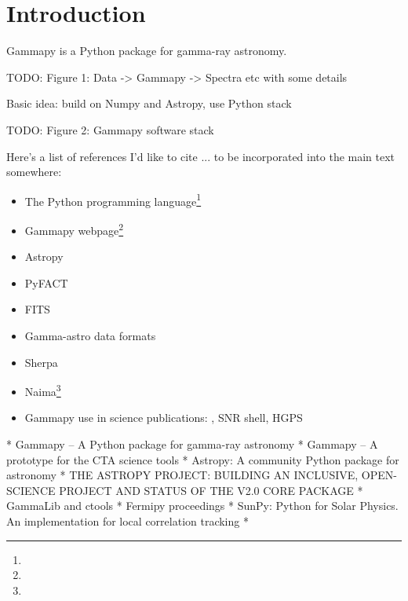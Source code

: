 \section{Introduction}
\label{sec:intro}

Gammapy is a Python package for gamma-ray astronomy.



TODO: Figure 1: Data -> Gammapy -> Spectra etc with some details 

Basic idea: build on Numpy and Astropy, use Python stack

TODO: Figure 2: Gammapy software stack

Here's a list of references I'd like to cite ... to be incorporated into the
main text somewhere:

\begin{itemize}
\item The Python programming language\footnote{\PythonUrl}
\item Gammapy webpage\footnote{\GammapyUrl}
\item Astropy \citep{astropy}
\item PyFACT \citep{pyfact}
\item FITS \citep{fits}
\item Gamma-astro data formats \cite{gadf-zenodo}
\item Sherpa \citep{sherpa-2011, sherpa-2009}
\item Naima\footnote{\NaimaUrl} \citep{Naima}
\item Gammapy use in science publications: \citep{Owen2015}, SNR shell, HGPS
\end{itemize}

* Gammapy – A Python package for gamma-ray astronomy
* Gammapy – A prototype for the CTA science tools 
* Astropy: A community Python package for astronomy
* THE ASTROPY PROJECT: BUILDING AN INCLUSIVE, OPEN-SCIENCE PROJECT AND STATUS OF THE V2.0 CORE PACKAGE
* GammaLib and ctools
* Fermipy proceedings
* SunPy: Python for Solar Physics. An implementation for local correlation tracking
*

